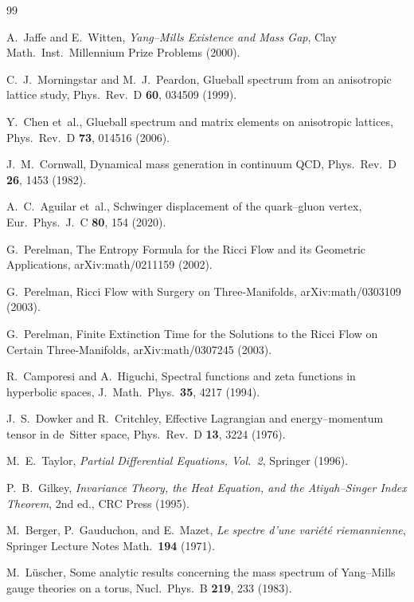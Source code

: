 \documentclass[
  aps,
  prd,
  reprint,
  superscriptaddress,
  nofootinbib,
  longbibliography,
  amsmath,
  amssymb
]{revtex4-2}
\theoremstyle{plain}
\theoremstyle{definition}
\theoremstyle{remark}
\begin{document}
\begin{thebibliography}{99}

A.~Jaffe and E.~Witten,
\textit{Yang--Mills Existence and Mass Gap},
Clay Math.\ Inst.\ Millennium Prize Problems (2000).

C.~J.~Morningstar and M.~J.~Peardon,
Glueball spectrum from an anisotropic lattice study,
Phys.\ Rev.\ D \textbf{60}, 034509 (1999).

Y.~Chen et~al.,
Glueball spectrum and matrix elements on anisotropic lattices,
Phys.\ Rev.\ D \textbf{73}, 014516 (2006).

J.~M.~Cornwall,
Dynamical mass generation in continuum QCD,
Phys.\ Rev.\ D \textbf{26}, 1453 (1982).

A.~C.~Aguilar et~al.,
Schwinger displacement of the quark--gluon vertex,
Eur.\ Phys.\ J.\ C \textbf{80}, 154 (2020).

G.~Perelman,
The Entropy Formula for the Ricci Flow and its Geometric Applications,
arXiv:math/0211159 (2002).

G.~Perelman,
Ricci Flow with Surgery on Three-Manifolds,
arXiv:math/0303109 (2003).

G.~Perelman,
Finite Extinction Time for the Solutions to the Ricci Flow on
Certain Three-Manifolds,
arXiv:math/0307245 (2003).

R.~Camporesi and A.~Higuchi,
Spectral functions and zeta functions in hyperbolic spaces,
J.\ Math.\ Phys.\ \textbf{35}, 4217 (1994).

J.~S.~Dowker and R.~Critchley,
Effective Lagrangian and energy--momentum tensor in de~Sitter space,
Phys.\ Rev.\ D \textbf{13}, 3224 (1976).

M.~E.~Taylor,
\textit{Partial Differential Equations, Vol.~2},
Springer (1996).

P.~B.~Gilkey,
\textit{Invariance Theory, the Heat Equation, and the
Atiyah--Singer Index Theorem}, 2nd ed., CRC Press (1995).

M.~Berger, P.~Gauduchon, and E.~Mazet,
\textit{Le spectre d'une vari\'et\'e riemannienne},
Springer Lecture Notes Math.\ \textbf{194} (1971).

M.~L\"uscher,
Some analytic results concerning the mass spectrum of Yang--Mills
gauge theories on a torus,
Nucl.\ Phys.\ B \textbf{219}, 233 (1983).


\end{thebibliography}
\end{document}
